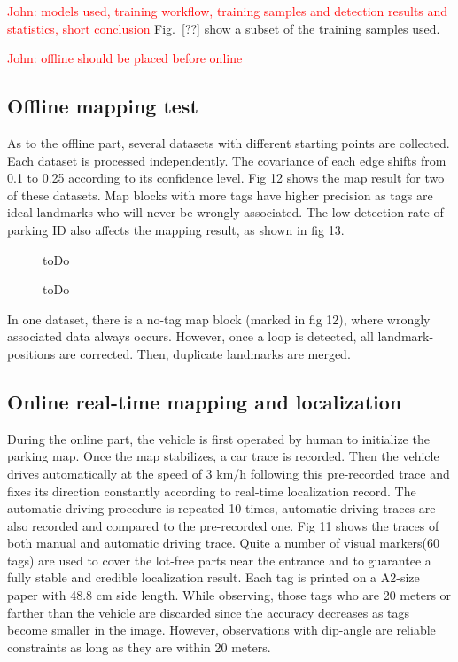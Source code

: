 \documentclass[journal]{IEEEtran}
\newcommand{\Reffig}[1]{Fig.~\ref{#1}}
\newcommand{\COMMENT}[1]{\textcolor{red}{#1}}
\begin{document}
\COMMENT{John: models used, training workflow, training samples and detection results and statistics, short conclusion}
\Reffig{??} show a subset of the training samples used.

\COMMENT{John: offline should be placed before online}

\subsection{Offline mapping test}
As to the offline part, several datasets with different starting points are collected. 
Each dataset is processed independently.
The covariance of each edge shifts from 0.1 to 0.25 according to its confidence level.
Fig 12 shows the map result for two of these datasets.
Map blocks with more tags have higher precision as tags are ideal landmarks who will never be wrongly associated.
The low detection rate of parking ID also affects the mapping result, as shown in fig 13.

\begin{figure}
\centering
\caption{
toDo%
}\label{fig:12}
\end{figure}

\begin{figure}
\centering
\caption{
toDo%
}\label{fig:13}
\end{figure}

In one dataset, there is a no-tag map block (marked in fig 12), where wrongly associated data always occurs.
However, once a loop is detected, all landmark-positions are corrected.
Then, duplicate landmarks are merged.

\subsection{Online real-time mapping and localization}
During the online part, the vehicle is first operated by human to initialize the parking map. 
Once the map stabilizes, a car trace is recorded.
Then the vehicle drives automatically at the speed of 3 km/h following this pre-recorded trace and fixes its direction constantly according to real-time localization record.
The automatic driving procedure is repeated 10 times, automatic driving traces are also recorded and compared to the pre-recorded one.
Fig 11 shows the traces of both manual and automatic driving trace.
Quite a number of visual markers(60 tags) are used to cover the lot-free parts near the entrance and to guarantee a fully stable and credible localization result.
Each tag is printed on a A2-size paper with 48.8 cm side length.
While observing, those tags who are 20 meters or farther than the vehicle are discarded since the accuracy decreases as tags become smaller in the image.
However, observations with dip-angle are reliable constraints as long as they are within 20 meters.
\end{document}
